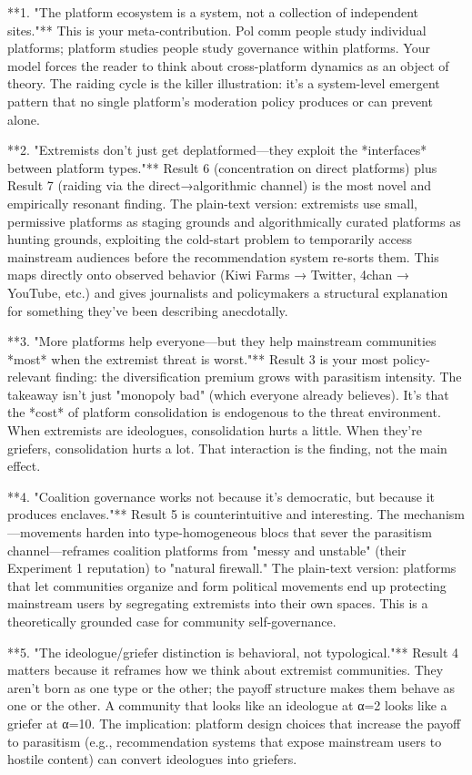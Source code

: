 **1. "The platform ecosystem is a system, not a collection of independent sites."** This is your meta-contribution. Pol comm people study individual platforms; platform studies people study governance within platforms. Your model forces the reader to think about cross-platform dynamics as an object of theory. The raiding cycle is the killer illustration: it's a system-level emergent pattern that no single platform's moderation policy produces or can prevent alone.

**2. "Extremists don't just get deplatformed—they exploit the *interfaces* between platform types."** Result 6 (concentration on direct platforms) plus Result 7 (raiding via the direct→algorithmic channel) is the most novel and empirically resonant finding. The plain-text version: extremists use small, permissive platforms as staging grounds and algorithmically curated platforms as hunting grounds, exploiting the cold-start problem to temporarily access mainstream audiences before the recommendation system re-sorts them. This maps directly onto observed behavior (Kiwi Farms → Twitter, 4chan → YouTube, etc.) and gives journalists and policymakers a structural explanation for something they've been describing anecdotally.

**3. "More platforms help everyone—but they help mainstream communities *most* when the extremist threat is worst."** Result 3 is your most policy-relevant finding: the diversification premium grows with parasitism intensity. The takeaway isn't just "monopoly bad" (which everyone already believes). It's that the *cost* of platform consolidation is endogenous to the threat environment. When extremists are ideologues, consolidation hurts a little. When they're griefers, consolidation hurts a lot. That interaction is the finding, not the main effect.

**4. "Coalition governance works not because it's democratic, but because it produces enclaves."** Result 5 is counterintuitive and interesting. The mechanism—movements harden into type-homogeneous blocs that sever the parasitism channel—reframes coalition platforms from "messy and unstable" (their Experiment 1 reputation) to "natural firewall." The plain-text version: platforms that let communities organize and form political movements end up protecting mainstream users by segregating extremists into their own spaces. This is a theoretically grounded case for community self-governance.

**5. "The ideologue/griefer distinction is behavioral, not typological."** Result 4 matters because it reframes how we think about extremist communities. They aren't born as one type or the other; the payoff structure makes them behave as one or the other. A community that looks like an ideologue at α=2 looks like a griefer at α=10. The implication: platform design choices that increase the payoff to parasitism (e.g., recommendation systems that expose mainstream users to hostile content) can convert ideologues into griefers.

